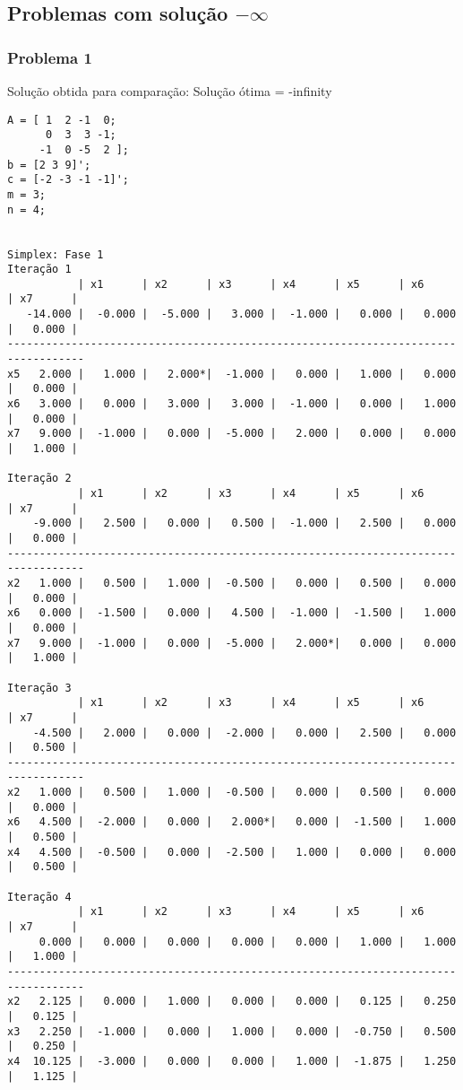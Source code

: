 \documentclass[brazil,times]{abnt}
\begin{document}
\subsection*{Problemas com solução $-\infty$}
\subsubsection*{Problema 1}
Solução obtida para comparação: Solução ótima = -infinity

{\scriptsize \begin{verbatim}
A = [ 1  2 -1  0;
      0  3  3 -1;
     -1  0 -5  2 ];
b = [2 3 9]';
c = [-2 -3 -1 -1]';
m = 3;
n = 4;


Simplex: Fase 1
Iteração 1
           | x1      | x2      | x3      | x4      | x5      | x6      | x7      |
   -14.000 |  -0.000 |  -5.000 |   3.000 |  -1.000 |   0.000 |   0.000 |   0.000 |
----------------------------------------------------------------------------------
x5   2.000 |   1.000 |   2.000*|  -1.000 |   0.000 |   1.000 |   0.000 |   0.000 |
x6   3.000 |   0.000 |   3.000 |   3.000 |  -1.000 |   0.000 |   1.000 |   0.000 |
x7   9.000 |  -1.000 |   0.000 |  -5.000 |   2.000 |   0.000 |   0.000 |   1.000 |

Iteração 2
           | x1      | x2      | x3      | x4      | x5      | x6      | x7      |
    -9.000 |   2.500 |   0.000 |   0.500 |  -1.000 |   2.500 |   0.000 |   0.000 |
----------------------------------------------------------------------------------
x2   1.000 |   0.500 |   1.000 |  -0.500 |   0.000 |   0.500 |   0.000 |   0.000 |
x6   0.000 |  -1.500 |   0.000 |   4.500 |  -1.000 |  -1.500 |   1.000 |   0.000 |
x7   9.000 |  -1.000 |   0.000 |  -5.000 |   2.000*|   0.000 |   0.000 |   1.000 |

Iteração 3
           | x1      | x2      | x3      | x4      | x5      | x6      | x7      |
    -4.500 |   2.000 |   0.000 |  -2.000 |   0.000 |   2.500 |   0.000 |   0.500 |
----------------------------------------------------------------------------------
x2   1.000 |   0.500 |   1.000 |  -0.500 |   0.000 |   0.500 |   0.000 |   0.000 |
x6   4.500 |  -2.000 |   0.000 |   2.000*|   0.000 |  -1.500 |   1.000 |   0.500 |
x4   4.500 |  -0.500 |   0.000 |  -2.500 |   1.000 |   0.000 |   0.000 |   0.500 |

Iteração 4
           | x1      | x2      | x3      | x4      | x5      | x6      | x7      |
     0.000 |   0.000 |   0.000 |   0.000 |   0.000 |   1.000 |   1.000 |   1.000 |
----------------------------------------------------------------------------------
x2   2.125 |   0.000 |   1.000 |   0.000 |   0.000 |   0.125 |   0.250 |   0.125 |
x3   2.250 |  -1.000 |   0.000 |   1.000 |   0.000 |  -0.750 |   0.500 |   0.250 |
x4  10.125 |  -3.000 |   0.000 |   0.000 |   1.000 |  -1.875 |   1.250 |   1.125 |


\end{verbatim}}
\end{document}
